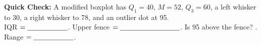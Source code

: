 \documentclass[10pt]{article}
\begin{document}
\vspace{0.08in}

\begin{tcolorbox}[colback=goldbg, colframe=goldacc, boxrule=0.8pt, arc=2mm,
    left=4mm, right=4mm, top=2mm, bottom=2mm]
\small\textbf{Quick Check:} A modified boxplot has $Q_1 = 40$, $M = 52$,
$Q_3 = 60$, a left whisker to 30, a right whisker to 78, and an outlier dot at 95.\\[4pt]
IQR $= \blank{2cm}$. \quad
Upper fence $= \blank{3cm}$. \quad
Is 95 above the fence? \blank{2cm}. \quad
Range $= \blank{2cm}$.
\end{tcolorbox}
\end{document}
